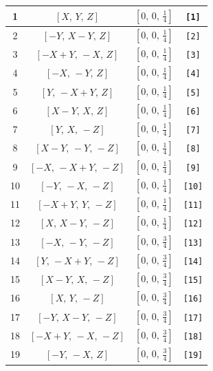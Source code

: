 \documentclass[fleqn,8pt]{jsarticle}
\begin{document}
\begin{longtable}{cccc}
1 & $\left[ X,\, Y,\, Z \right]$ & $\left[ 0,\, 0,\, \frac{1}{4} \right]$ & {\tt [1]} \\ \hline
2 & $\left[ - Y,\, X - Y,\, Z \right]$ & $\left[ 0,\, 0,\, \frac{1}{4} \right]$ & {\tt [2]} \\ \hline
3 & $\left[ - X + Y,\, - X,\, Z \right]$ & $\left[ 0,\, 0,\, \frac{1}{4} \right]$ & {\tt [3]} \\ \hline
4 & $\left[ - X,\, - Y,\, Z \right]$ & $\left[ 0,\, 0,\, \frac{1}{4} \right]$ & {\tt [4]} \\ \hline
5 & $\left[ Y,\, - X + Y,\, Z \right]$ & $\left[ 0,\, 0,\, \frac{1}{4} \right]$ & {\tt [5]} \\ \hline
6 & $\left[ X - Y,\, X,\, Z \right]$ & $\left[ 0,\, 0,\, \frac{1}{4} \right]$ & {\tt [6]} \\ \hline
7 & $\left[ Y,\, X,\, - Z \right]$ & $\left[ 0,\, 0,\, \frac{1}{4} \right]$ & {\tt [7]} \\ \hline
8 & $\left[ X - Y,\, - Y,\, - Z \right]$ & $\left[ 0,\, 0,\, \frac{1}{4} \right]$ & {\tt [8]} \\ \hline
9 & $\left[ - X,\, - X + Y,\, - Z \right]$ & $\left[ 0,\, 0,\, \frac{1}{4} \right]$ & {\tt [9]} \\ \hline
10 & $\left[ - Y,\, - X,\, - Z \right]$ & $\left[ 0,\, 0,\, \frac{1}{4} \right]$ & {\tt [10]} \\ \hline
11 & $\left[ - X + Y,\, Y,\, - Z \right]$ & $\left[ 0,\, 0,\, \frac{1}{4} \right]$ & {\tt [11]} \\ \hline
12 & $\left[ X,\, X - Y,\, - Z \right]$ & $\left[ 0,\, 0,\, \frac{1}{4} \right]$ & {\tt [12]} \\ \hline
13 & $\left[ - X,\, - Y,\, - Z \right]$ & $\left[ 0,\, 0,\, \frac{3}{4} \right]$ & {\tt [13]} \\ \hline
14 & $\left[ Y,\, - X + Y,\, - Z \right]$ & $\left[ 0,\, 0,\, \frac{3}{4} \right]$ & {\tt [14]} \\ \hline
15 & $\left[ X - Y,\, X,\, - Z \right]$ & $\left[ 0,\, 0,\, \frac{3}{4} \right]$ & {\tt [15]} \\ \hline
16 & $\left[ X,\, Y,\, - Z \right]$ & $\left[ 0,\, 0,\, \frac{3}{4} \right]$ & {\tt [16]} \\ \hline
17 & $\left[ - Y,\, X - Y,\, - Z \right]$ & $\left[ 0,\, 0,\, \frac{3}{4} \right]$ & {\tt [17]} \\ \hline
18 & $\left[ - X + Y,\, - X,\, - Z \right]$ & $\left[ 0,\, 0,\, \frac{3}{4} \right]$ & {\tt [18]} \\ \hline
19 & $\left[ - Y,\, - X,\, Z \right]$ & $\left[ 0,\, 0,\, \frac{3}{4} \right]$ & {\tt [19]} \\ \hline

\end{longtable}
\end{document}
